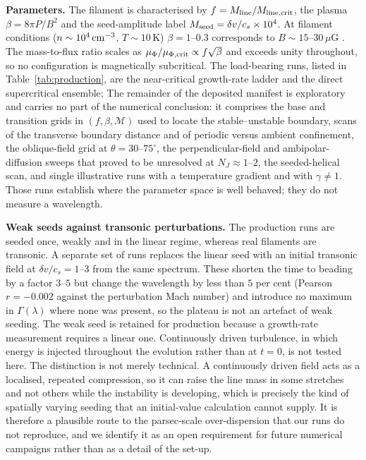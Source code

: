 \documentclass[usenatbib,twoside,twocolumn]{mnras}
\begin{document}
\smallskip\noindent\textbf{Parameters.} The filament is characterised by $f=M_{\rm line}/M_{\rm line,crit}$, the plasma $\beta=8\pi P/B^2$ and the seed-amplitude label $M_{\rm seed}=\delta v/c_s\times10^{4}$. At filament conditions ($n\sim10^4\,{\rm cm^{-3}}$, $T\sim10$\,K) $\beta=1$--$0.3$ corresponds to $B\sim15$--$30\,\mu$G \citep{Crutcher2012}. The mass-to-flux ratio scales as $\mu_\Phi/\mu_{\Phi,\rm crit}\propto f\sqrt{\beta}$ and exceeds unity throughout, so no configuration is magnetically subcritical. The load-bearing runs, listed in Table~\ref{tab:production}, are the near-critical growth-rate ladder and the direct supercritical ensemble; The remainder of the deposited manifest is exploratory and carries no part of the numerical conclusion: it comprises the base and transition grids in $(f,\beta,\mathcal{M})$ used to locate the stable--unstable boundary, scans of the transverse boundary distance and of periodic versus ambient confinement, the oblique-field grid at $\theta=30$--$75^\circ$, the perpendicular-field and ambipolar-diffusion sweeps that proved to be unresolved at $N_J\approx1$--$2$, the seeded-helical scan, and single illustrative runs with a temperature gradient and with $\gamma\neq1$. Those runs establish where the parameter space is well behaved; they do not measure a wavelength.

\smallskip\noindent\textbf{Weak seeds against transonic perturbations.} The production runs are seeded once, weakly and in the linear regime, whereas real filaments are transonic. A separate set of runs replaces the linear seed with an initial transonic field at $\delta v/c_s=1$--$3$ from the same spectrum. These shorten the time to beading by a factor $3$--$5$ but change the wavelength by less than $5$ per cent (Pearson $r=-0.002$ against the perturbation Mach number) and introduce no maximum in $\Gamma(\lambda)$ where none was present, so the plateau is not an artefact of weak seeding. The weak seed is retained for production because a growth-rate measurement requires a linear one. Continuously driven turbulence, in which energy is injected throughout the evolution rather than at $t=0$, is not tested here. The distinction is not merely technical. A continuously driven field acts as a localised, repeated compression, so it can raise the line mass in some stretches and not others while the instability is developing, which is precisely the kind of spatially varying seeding that an initial-value calculation cannot supply. It is therefore a plausible route to the parsec-scale over-dispersion that our runs do not reproduce, and we identify it as an open requirement for future numerical campaigns rather than as a detail of the set-up.
\end{document}
